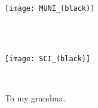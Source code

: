 \documentclass[12pt,a4paper,oneside,final]{book}
\begin{document}


\pagestyle{empty}




\changetext{}{11.6mm}{}{}{}
\begin{adjustwidth}{-12mm}{}
 \hspace{12mm}
\begin{minipage}{28mm}
  \texttt{[image: MUNI\_(black)]}
\end{minipage}\hspace{2mm}
\begin{minipage}{90mm}
  \begin{center}\vspace*{3mm}
    {\fontsize{20pt}{28pt}}\\[2mm]
    {\fontsize{19pt}{28pt}}\\[1mm] %
  \end{center}
\end{minipage}\hspace{2mm}
\begin{minipage}{28mm}
  \texttt{[image: SCI\_(black)]}
\end{minipage}
\end{adjustwidth}
\changetext{}{-11.6mm}{}{}{}

 \vspace{8cm}

  \begin{center}
      {\fontsize{28pt}{26pt}\selectfont{Ph.D. Thesis}}\\
      \vspace{1ex}
      \vspace{6ex}
      {\fontsize{24pt}{26pt}\selectfont{
          Title - %
      }}
  \end{center}

\vspace*{9mm}

\vfill


\begin{center}
{\fontsize{20pt}{28pt}\selectfont{Brno 2021} \hfill \selectfont{Stanislav Geidl}}
\end{center}


\normalsize
\clearpage
\begin{center}
\vspace*{10cm}
To my grandma.
\end{center}
\end{document}

